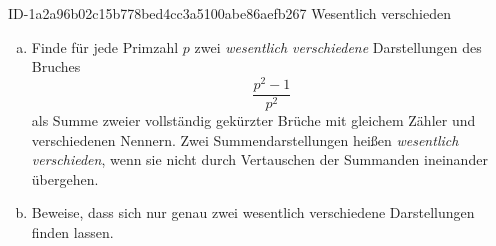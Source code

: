 \begin{exercise}
      {ID-1a2a96b02c15b778bed4cc3a5100abe86aefb267}
      {Wesentlich verschieden}
  \ifproblem\problem\par
    \begin{enumerate}[a)]
      \item Finde für jede Primzahl $p$ zwei \emph{wesentlich verschiedene}
            Darstellungen des Bruches
            \begin{equation*}
              \frac{p^{2}-1}{p^{2}}
            \end{equation*}
            als Summe zweier vollständig gekürzter Brüche mit gleichem Zähler und
            verschiedenen Nennern. Zwei Summendarstellungen heißen \emph{wesentlich
            verschieden}, wenn sie nicht durch Vertauschen der Summanden ineinander
            übergehen.
      \item Beweise, dass sich nur genau zwei wesentlich verschiedene Darstellungen
            finden lassen.
    \end{enumerate}
  \fi
\end{exercise}
